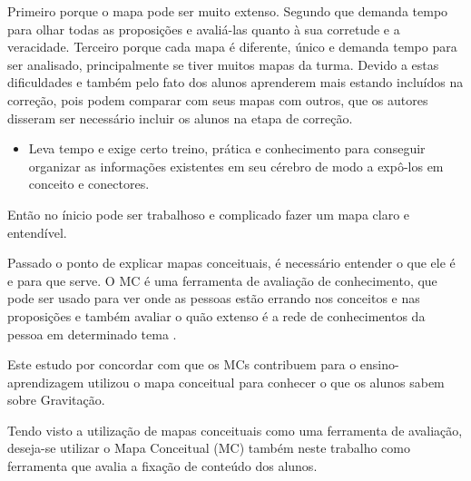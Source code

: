  Primeiro porque o mapa pode ser muito extenso. Segundo que demanda tempo para olhar todas as proposições e avaliá-las quanto à sua corretude e a veracidade. Terceiro porque cada mapa é diferente, único e demanda tempo para ser analisado, principalmente se tiver muitos mapas da turma. Devido a estas dificuldades e também pelo fato dos alunos aprenderem mais estando incluídos na correção, pois podem comparar com seus mapas com outros, que os autores \cite{dificuldadesMapaConceitual} disseram ser necessário incluir os alunos na etapa de correção. 


\begin{itemize}
\item Leva tempo e exige certo treino, prática e conhecimento para conseguir organizar as informações existentes em seu cérebro de modo a expô-los em conceito e conectores.
\end{itemize}

Então no ínicio pode ser trabalhoso e complicado fazer um mapa claro e entendível.

Passado o ponto de explicar mapas conceituais, é necessário entender o que ele é e para que serve.
O MC é uma ferramenta de avaliação de conhecimento, que pode ser usado para ver onde as pessoas estão errando nos conceitos e nas proposições e também avaliar o quão extenso é a rede de conhecimentos da pessoa em determinado tema \cite{vantagensDesvantagensMC}.

Este estudo \cite{leiDeNewtonMC} por concordar com \cite{novak} que os MCs contribuem para o ensino-aprendizagem utilizou o mapa conceitual para conhecer o que os alunos sabem sobre Gravitação.


Tendo visto a utilização de mapas conceituais como uma ferramenta de avaliação, deseja-se utilizar o Mapa Conceitual (MC) também neste trabalho como ferramenta que avalia a fixação de conteúdo dos alunos. 

